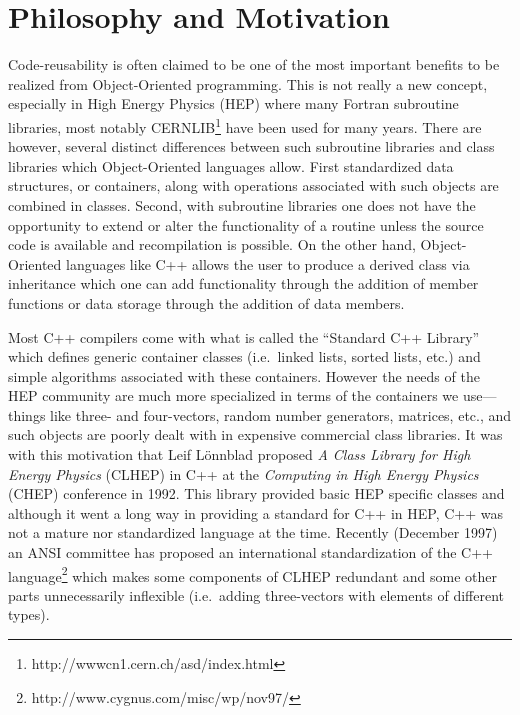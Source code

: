 \documentclass[twoside]{article}
\begin{document}
\section{Philosophy and Motivation} 
\label{Philosophy}

Code-reusability is often claimed to be one of the most important
benefits to be realized from Object-Oriented programming.  This 
is not really a new concept, especially in High Energy
Physics (HEP) where many Fortran subroutine libraries, most notably
CERNLIB\footnote{http://wwwcn1.cern.ch/asd/index.html}
have been used for many years.  There are however, several distinct
differences between such subroutine libraries and class libraries
which Object-Oriented languages allow.  First standardized data
structures, or containers, along with operations associated with such
objects are combined in classes.  Second, with subroutine libraries
one does not have the opportunity to extend or alter the functionality
of a routine unless the source code is available and recompilation
is possible.  On the other hand, Object-Oriented languages like C++ allows
the user to produce a derived class via inheritance which one can add
functionality through the addition of member
functions 
or data storage through the addition of data members.

Most C++ compilers come with what is called the ``Standard C++
Library'' which defines generic container
classes (i.e.~linked lists, sorted lists, etc.) and simple algorithms
associated with these containers.  However the needs of the HEP community
are much more specialized in terms of the containers we use---things
like three- and four-vectors, random number generators, matrices, etc.,
and such objects are poorly dealt with in expensive commercial class
libraries.  It was with this motivation that  Leif L\"{o}nnblad proposed
{\em A Class Library for High Energy Physics} (CLHEP)  in C++ at the
{\em Computing in High Energy Physics} (CHEP) conference in 1992.  This library provided
basic HEP specific classes and although it went a long way in providing a
standard for C++ in HEP, C++ was not a mature nor standardized language
at the time.  Recently (December 1997) an ANSI committee has proposed
an international standardization of the C++
language\footnote{http://www.cygnus.com/misc/wp/nov97/}
which makes some components of CLHEP redundant and some other parts
unnecessarily inflexible (i.e.~adding three-vectors with elements of
different types).
\end{document}
